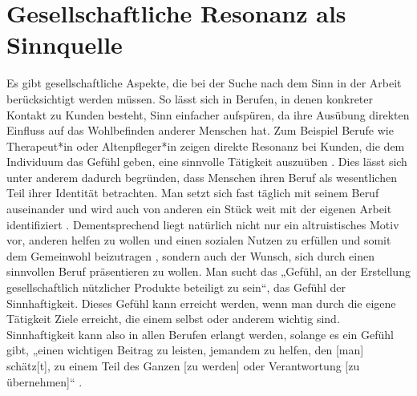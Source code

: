 \section{Gesellschaftliche Resonanz als Sinnquelle}
Es gibt gesellschaftliche Aspekte, die bei der Suche nach dem Sinn in der Arbeit berücksichtigt werden müssen. So lässt sich in Berufen, in denen konkreter Kontakt zu Kunden besteht, Sinn einfacher aufspüren, da ihre Ausübung direkten Einfluss auf das Wohlbefinden anderer Menschen hat. Zum Beispiel Berufe wie Therapeut*in oder Altenpfleger*in zeigen direkte Resonanz bei Kunden, die dem Individuum das Gefühl geben, eine sinnvolle Tätigkeit auszuüben \cite[S.192-193]{Voswinkel.2018}. Dies lässt sich unter anderem dadurch begründen, dass Menschen ihren Beruf als wesentlichen Teil ihrer Identität betrachten. Man setzt sich fast täglich mit seinem Beruf auseinander und wird auch von anderen ein Stück weit mit der eigenen Arbeit identifiziert \cite[S.193]{Voswinkel.2018}. Dementsprechend liegt natürlich nicht nur ein altruistisches Motiv vor, anderen helfen zu wollen und einen sozialen Nutzen zu erfüllen und somit dem Gemeinwohl beizutragen \cite[S.193]{Voswinkel.2018}, sondern auch der Wunsch, sich durch einen sinnvollen Beruf präsentieren zu wollen. Man sucht das „Gefühl, an der Erstellung gesellschaftlich nützlicher Produkte beteiligt zu sein“\cite[S.193]{Voswinkel.2018}, das Gefühl der Sinnhaftigkeit. Dieses Gefühl kann erreicht werden, wenn man durch die eigene Tätigkeit Ziele erreicht, die einem selbst oder anderem wichtig sind. Sinnhaftigkeit kann also in allen Berufen erlangt werden, solange es ein Gefühl gibt, „einen wichtigen Beitrag zu leisten, jemandem zu helfen, den [man] schätz[t], zu einem Teil des Ganzen [zu werden] oder Verantwortung [zu übernehmen]“ \cite[S.205-206]{FluterHoffmann.2018}.
